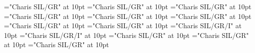 \documentclass[c5paper,twoside]{article}
\begin{document}
\font\pronunciationsentryletDatadicBody="Charis SIL/GR" at 10pt
\font\pronunciationggofonipaxemicpronunciationsentryletDatadicBody="Charis SIL/GR" at 10pt
\font\spanggofonipaxemicpronunciationggofonipaxemicpronunciationsentryletDatadicBody="Charis SIL/GR" at 10pt
\font\sensesentryletDatadicBody="Charis SIL/GR" at 10pt
\font\sensesensesentryletDatadicBody="Charis SIL/GR" at 10pt
\font\LexSensepublishStemGlossPubLdtesensesensesentryletDatadicBody="Charis SIL/GR" at 10pt
\font\spanteLexSensepublishStemGlossPubLdtesensesensesentryletDatadicBody="Charis SIL/GR" at 10pt
\font\examplessensesensesentryletDatadicBody="Charis SIL/GR" at 10pt
\font\exampleggoTeluINexamplessensesensesentryletDatadicBody="Charis SIL/GR/I" at 10pt
\font\spanggoTeluINexampleggoTeluINexamplessensesensesentryletDatadicBody="Charis SIL/GR/I" at 10pt
\font\translationsexamplessensesensesentryletDatadicBody="Charis SIL/GR" at 10pt
\font\translationLdtetranslationsexamplessensesensesentryletDatadicBody="Charis SIL/GR" at 10pt
\font\spantetranslationLdtetranslationsexamplessensesensesentryletDatadicBody="Charis SIL/GR" at 10pt
\end{document}
